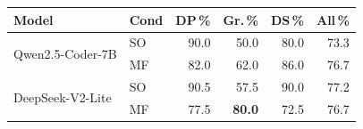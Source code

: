 \footnotesize
\setlength{\tabcolsep}{3pt}
\begin{tabular}{@{}llrrrr@{}}
\toprule
Model & Cond & DP\,\% & Gr.\,\% & DS\,\% & All\,\% \\
\midrule
\multirow{2}{*}{Qwen2.5-Coder-7B}
  & SO & 90.0 & 50.0 & 80.0 & 73.3 \\
  & MF & 82.0 & 62.0 & 86.0 & 76.7 \\
\midrule
\multirow{2}{*}{DeepSeek-V2-Lite}
  & SO & 90.5 & 57.5 & 90.0 & 77.2 \\
  & MF & 77.5 & \textbf{80.0} & 72.5 & 76.7 \\
\bottomrule
\end{tabular}

